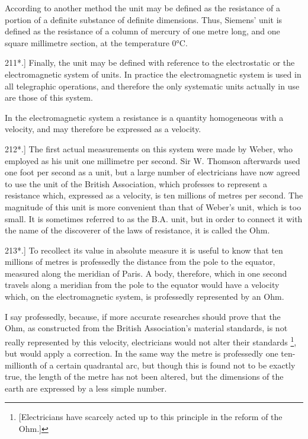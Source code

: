 \documentclass[12pt,oneside]{book}[2021/10/04]
\let\oldfootnote\footnote
\renewcommand\footnote[1]{%
\oldfootnote{\hspace{0.14em}#1}}
\newcommand{\Runhead}[1]{\fancyhead[C]{\iffloatpage{}{\small#1}}}
\newcommand{\article}[1]{\phantomsection \label{art:#1}{#1.]}}
\newcommand{\¬}{\hphantom{0}}
\begin{document}
According to another method the unit may be defined as the
resistance of a portion of a definite substance of definite dimensions.
Thus, Siemens' unit is defined as the resistance of a column of
mercury of one metre long, and one square millimetre section, at
the temperature 0°C.
\Runhead{UNIT OF RESISTANCE.}

\article{211*} Finally, the unit may be defined with reference to the electrostatic
or the electromagnetic system of units. In practice the electromagnetic
system is used in all telegraphic operations, and therefore
the only systematic units actually in use are those of this system.

In the electromagnetic system a resistance is a quantity homogeneous
with a velocity, and may therefore be expressed as a velocity.

\article{212*} The first actual measurements on this system were made
by Weber, who employed as his unit one millimetre per second.
Sir W. Thomson afterwards used one foot per second as a unit,
but a large number of electricians have now agreed to use the
unit of the British Association, which professes to represent a
resistance which, expressed as a velocity, is ten millions of metres
per second. The magnitude of this unit is more convenient than
that of Weber's unit, which is too small. It is sometimes referred
to as the B.A. unit, but in order to connect it with the name of
the discoverer of the laws of resistance, it is called the Ohm.

\article{213*} To recollect its value in absolute measure it is useful
to know that ten millions of metres is professedly the distance
from the pole to the equator, measured along the meridian of Paris.
A body, therefore, which in one second travels along a meridian
from the pole to the equator would have a velocity which, on the
electromagnetic system, is professedly represented by an Ohm.

I say professedly, because, if more accurate researches should
prove that the Ohm, as constructed from the British Association's
material standards, is not really represented by this velocity, electricians
would not alter their standards\footnote{[Electricians have scarcely acted up to this principle in the reform of the Ohm.]}, but would apply a correction.
In the same way the metre is professedly one ten-millionth
of a certain quadrantal arc, but though this is found not to be
exactly true, the length of the metre has not been altered, but the
dimensions of the earth are expressed by a less simple number.
\end{document}
